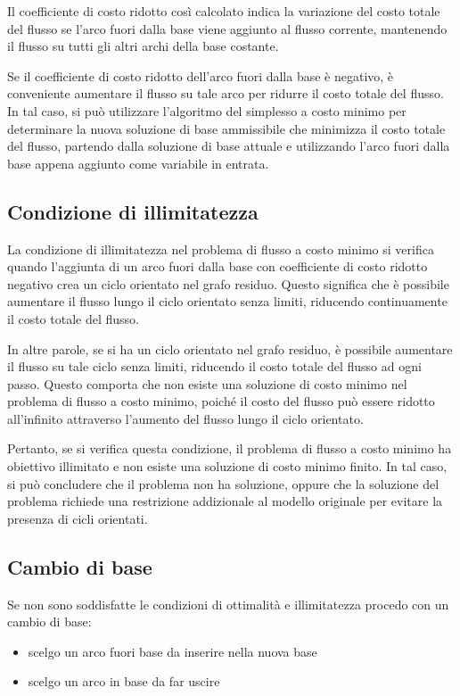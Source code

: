Il coefficiente di costo ridotto così calcolato indica la variazione del costo totale del flusso se l'arco fuori dalla base viene aggiunto al flusso corrente, mantenendo il flusso su tutti gli altri archi della base costante. 

Se il coefficiente di costo ridotto dell'arco fuori dalla base è negativo, è conveniente aumentare il flusso su tale arco per ridurre il costo totale del flusso. In tal caso, si può utilizzare l'algoritmo del simplesso a costo minimo per determinare la nuova soluzione di base ammissibile che minimizza il costo totale del flusso, partendo dalla soluzione di base attuale e utilizzando l'arco fuori dalla base appena aggiunto come variabile in entrata.

\subsection{Condizione di illimitatezza}
La condizione di illimitatezza nel problema di flusso a costo minimo si verifica quando l'aggiunta di un arco fuori dalla base con coefficiente di costo ridotto negativo crea un ciclo orientato nel grafo residuo. Questo significa che è possibile aumentare il flusso lungo il ciclo orientato senza limiti, riducendo continuamente il costo totale del flusso.

In altre parole, se si ha un ciclo orientato nel grafo residuo, è possibile aumentare il flusso su tale ciclo senza limiti, riducendo il costo totale del flusso ad ogni passo. Questo comporta che non esiste una soluzione di costo minimo nel problema di flusso a costo minimo, poiché il costo del flusso può essere ridotto all'infinito attraverso l'aumento del flusso lungo il ciclo orientato.

Pertanto, se si verifica questa condizione, il problema di flusso a costo minimo ha obiettivo illimitato e non esiste una soluzione di costo minimo finito. In tal caso, si può concludere che il problema non ha soluzione, oppure che la soluzione del problema richiede una restrizione addizionale al modello originale per evitare la presenza di cicli orientati.

\subsection{Cambio di base}
Se non sono soddisfatte le condizioni di ottimalità e illimitatezza procedo con un cambio di base:
\begin{itemize}
  \item scelgo un arco fuori base da inserire nella nuova base
  \item scelgo un arco in base da far uscire
\end{itemize}

